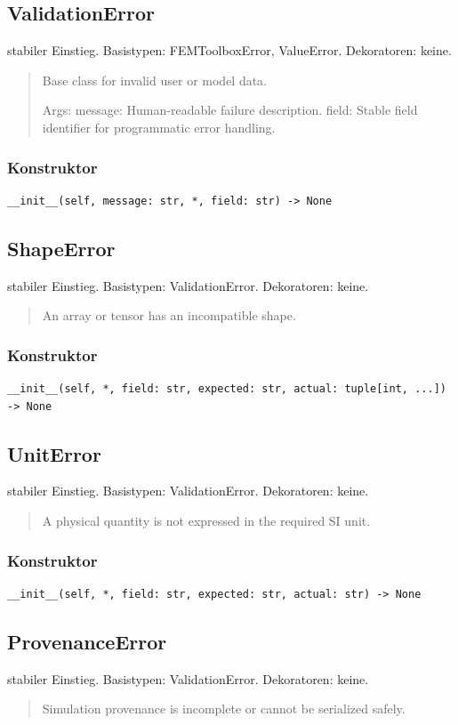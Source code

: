 \subsection{ValidationError}
stabiler Einstieg.
Basistypen: FEMToolboxError, ValueError. Dekoratoren: keine.
\begin{quote}
Base class for invalid user or model data.\par Args:     message: Human-readable failure description.     field: Stable field identifier for programmatic error handling.
\end{quote}
\subsubsection*{Konstruktor}
\begin{lstlisting}
__init__(self, message: str, *, field: str) -> None
\end{lstlisting}
\subsection{ShapeError}
stabiler Einstieg.
Basistypen: ValidationError. Dekoratoren: keine.
\begin{quote}
An array or tensor has an incompatible shape.
\end{quote}
\subsubsection*{Konstruktor}
\begin{lstlisting}
__init__(self, *, field: str, expected: str, actual: tuple[int, ...]) -> None
\end{lstlisting}
\subsection{UnitError}
stabiler Einstieg.
Basistypen: ValidationError. Dekoratoren: keine.
\begin{quote}
A physical quantity is not expressed in the required SI unit.
\end{quote}
\subsubsection*{Konstruktor}
\begin{lstlisting}
__init__(self, *, field: str, expected: str, actual: str) -> None
\end{lstlisting}
\subsection{ProvenanceError}
stabiler Einstieg.
Basistypen: ValidationError. Dekoratoren: keine.
\begin{quote}
Simulation provenance is incomplete or cannot be serialized safely.
\end{quote}
